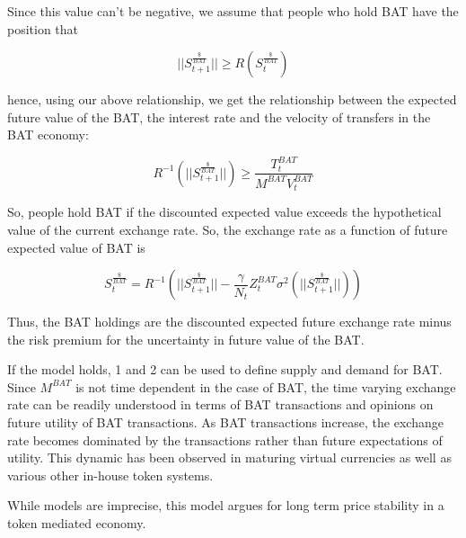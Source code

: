 \documentclass[11pt]{article}
\begin{document}
Since this value can't be negative, we assume that people who hold BAT
have the position that

\[ ||S^{\frac{\$}{BAT}}_{t+1}|| \geq R( S^{\frac{\$}{BAT}}_{t})\]

hence, using our above relationship, we get the relationship between the expected future value of the BAT, the interest rate and the velocity of transfers in the BAT economy:

\[R^{-1} (||S^{\frac{\$}{BAT}}_{t+1}||) \geq \frac{T^{BAT}_{t}}{M^{BAT} V^{BAT}_{t}} \]

So, people hold BAT if the discounted expected value exceeds the
hypothetical value of the current exchange rate. So, the exchange rate
as a function of future expected value of BAT is

\[\tag{2} S^{\frac{\$}{BAT}}_{t} = R^{-1} (||S^{\frac{\$}{BAT}}_{t+1}|| -\frac{\gamma}{N_t}Z^{BAT}_{t} \sigma^{2}(||S^{\frac{\$}{BAT}}_{t+1} ||) )\]
    
Thus, the BAT holdings are the discounted expected future exchange
rate minus the risk premium for the uncertainty in future value of the
BAT.

If the model holds, {1} and {2} can be used to define supply and
demand for BAT. Since $M^{BAT}$ is not time dependent in the case of BAT, the
time varying exchange rate can be readily understood in terms of BAT
transactions and opinions on future utility of BAT transactions. As
BAT transactions increase, the exchange rate becomes dominated by the
transactions rather than future expectations of utility. This dynamic
has been observed in maturing virtual currencies as well as various
other in-house token systems.

While models are imprecise, this model argues for long term price
stability in a token mediated economy. 

\printbibliography

\vspace*{\fill}

\begin{flushright}

\pdfcreationdate
\end{flushright}
\end{document}
